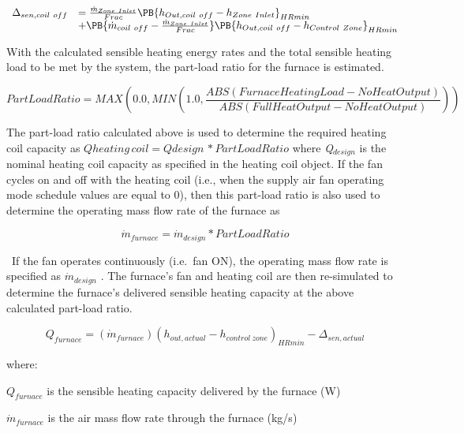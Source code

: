 \begin{equation}
  \begin{array}{rl}
    \Delta_{sen,coil~off} &= \frac{\dot{m}_{Zone~Inlet}}{Frac} \PB{h_{Out,coil~off} - h_{Zone~Inlet}}_{HRmin} \\
                           &+ \PB{\dot{m}_{coil~off} - \frac{\dot{m}_{Zone~Inlet}}{Frac}} \PB{h_{Out,coil~off} - h_{Control~Zone}}_{HRmin}
  \end{array}
\end{equation}

With the calculated sensible heating energy rates and the total sensible heating load to be met by the system, the part-load ratio for the furnace is estimated.

\begin{equation}
PartLoadRatio = MAX\left( {0.0,MIN\left( {1.0,\frac{{ABS\left( {FurnaceHeatingLoad - NoHeatOutput} \right)}}{{ABS(FullHeatOutput - NoHeatOutput)}}} \right)} \right)
\end{equation}

The part-load ratio calculated above is used to determine the required heating coil capacity as \(Qheating\,coil = Qdesign\,*PartLoadRatio\) where \emph{Q\(_{design}\)} is the nominal heating coil capacity as specified in the heating coil object. If the fan cycles on and off with the heating coil (i.e., when the supply air fan operating mode schedule values are equal to 0), then this part-load ratio is also used to determine the operating mass flow rate of the furnace as

\begin{equation}
{\dot m_{furnace}} = {\dot m_{design}}*PartLoadRatio
\end{equation}

~If the fan operates continuously (i.e.~fan ON), the operating mass flow rate is specified as \({\dot m_{design}}\) . The furnace's fan and heating coil are then re-simulated to determine the furnace's delivered sensible heating capacity at the above calculated part-load ratio.

\begin{equation}
{Q_{furnace}} = \left( {{{\dot m}_{furnace}}} \right){\left( {{h_{out,actual}} - {h_{control~zone}}} \right)_{HRmin}} - {\Delta_{sen,actual}}
\end{equation}

where:

\({Q_{furnace}}\) is the sensible heating capacity delivered by the furnace (W)

\({\dot m_{furnace}}\) is the air mass flow rate through the furnace (kg/s)

